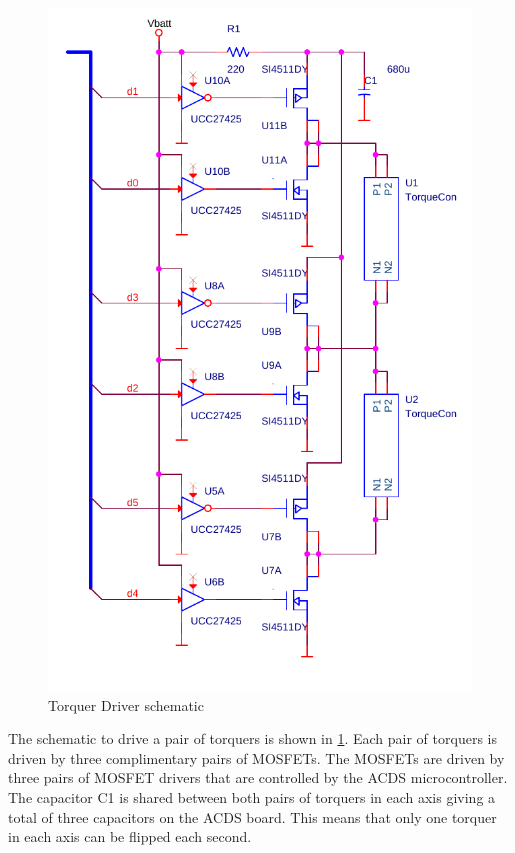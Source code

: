 \begin{figure}[H]
    \centering
    \includegraphics[height=0.5\textheight]{Figures/driverSchematic}
    \caption{Torquer Driver schematic}
    \label{fig:drive}
\end{figure}

The schematic to drive a pair of torquers is shown in \cref{fig:drive}. Each pair of torquers is driven by three complimentary pairs of \acp{MOSFET}.  The \acp{MOSFET} are driven by three pairs of \ac{MOSFET} drivers that are controlled by the \ac{ACDS} microcontroller. The capacitor C1 is shared between both pairs of torquers in each axis giving a total of three capacitors on the \ac{ACDS} board. This means that only one torquer in each axis can be flipped each second. 

